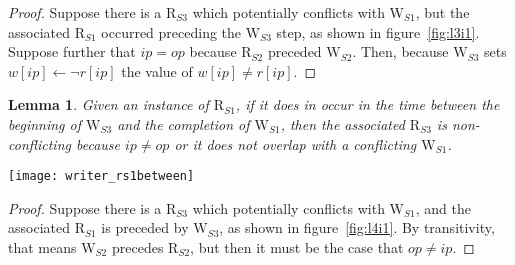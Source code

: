 \documentclass{article}
\newtheorem{lemma}{Lemma}
\newcommand\RS[1]{\ensuremath{\text{R}_{S#1}}}
\newcommand\WS[1]{\ensuremath{\text{W}_{S#1}}}
\newcommand\W[1]{\ensuremath{w\left[#1\right]}}
\newcommand\R[1]{\ensuremath{r\left[#1\right]}}
\newcommand\ip{\ensuremath{ip}}
\newcommand\op{\ensuremath{op}}
\begin{document}
\begin{proof}
  Suppose there is a \RS3 which potentially conflicts with \WS1, but
  the associated \RS1 occurred preceding the \WS3 step, as shown in
  figure~\ref{fig:l3i1}. Suppose further that $\ip=\op$ because \RS2
  preceded \WS2. Then, because \WS3 sets $\W{\ip}\gets\neg\R{\ip}$ the
  value of $\W{\ip}\neq\R{\ip}$.
\end{proof}

\begin{lemma}\label{lma:rs1between}
  Given an instance of \RS1, if it does in occur in the time between
  the beginning of \WS3 and the completion of \WS1, then the
  associated \RS3 is non-conflicting because $\ip\neq\op$ or it does
  not overlap with a conflicting \WS1.
\end{lemma}

\begin{figure*}[h]
  \centering
  \texttt{[image: writer\_rs1between]}
  \caption{\RS1 occurs at least once between \WS3 and completion of \WS1, as well as a case where $\op=\ip$}
  \label{fig:l4i1}
\end{figure*}

\begin{proof}
  Suppose there is a \RS3 which potentially conflicts with \WS1, and
  the associated \RS1 is preceded by \WS3, as shown in
  figure~\ref{fig:l4i1}. By transitivity, that means \WS2 precedes
  \RS2, but then it must be the case that $\op\neq\ip$.
\end{proof}
\end{document}
